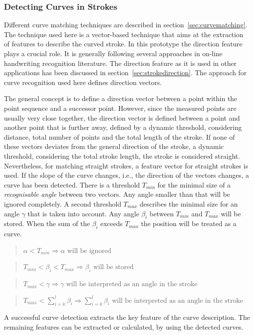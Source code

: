 \subsubsection{Detecting Curves in Strokes}
\label{sec:hwre:detectingcurvesinstrokes}

Different curve matching techniques are described in 
section~\ref{sec:curvematching}. The technique used here is a 
vector-based technique that aims at the extraction of features to describe
the curved stroke. In this prototype the direction feature plays a crucial role.
It is generally following several approaches in on-line handwriting recognition
literature. The direction feature as it is used in other applications has been
discussed in section~\ref{sec:strokedirection}. The approach for curve
recognition used here defines direction vectors.

The general concept is to define a direction vector between a point
within the point sequence and a successor point.
However, since the measured points are usually very close together, 
the direction vector is defined between a point and another point that 
is further away, defined by a dynamic threshold, considering distance,
total number of points and the total length of the stroke.
If none of these vectors deviates from the general direction of the stroke,
a dynamic threshold, considering the total stroke length,
the stroke is considered straight. Nevertheless, for matching straight strokes,
a feature vector for straight strokes is used.
If the slope of the curve changes, i.e., the direction of the vectors changes, 
a curve has been detected. 
There is a threshold \( T_{min} \) for the minimal size of a 
\emph{recognisable angle} between two vectors. Any angle smaller than that will 
be ignored completely. A second threshold \( T_{max} \) describes the minimal size
for an angle \( \gamma \)  that is taken into account.
Any angle \( \beta_{i} \) between \( T_{min} \) and \( T_{max} \) will be stored. 
When the sum of the \( \beta_{i} \) exceeds \( T_{max} \) the position will be 
treated as a curve.

\begin{quote}
\(
  \alpha < T_{min} \Rightarrow \alpha \text{ will be ignored}
\)
\end{quote}
\begin{quote}
\(
  T_{min} < \beta_{i} < T_{max} \Rightarrow \beta_{i} \text{ will be stored}
\)
\end{quote}
\begin{quote}
\(
  T_{max} < \gamma \Rightarrow 
                  \gamma \text{ will be interpreted as an angle in the stroke}
\)
\end{quote}
\begin{quote}
\(
  T_{max} < \sum\limits_{i=k}^{l} \beta_{i} \Rightarrow 
                               \sum\limits_{i=k}^{l} \beta_{i}
                               \text{ will be interpreted as an 
                               angle in the stroke}
\)
\end{quote}
A successful curve detection extracts the key feature of the curve 
description. The remaining features can be extracted or calculated,
by using the detected curves.

